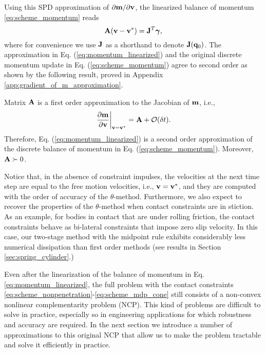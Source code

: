 Using this SPD approximation of $\partial {\mathbf{m}}/\partial {\mathbf{v}}$, the
linearized balance of momentum \eqref{eq:scheme_momentum} reads
\begin{equation}
	\mf{A}(\mf{v}-\mf{v}^*) = \mf{J}^T\mf{\bgamma},
	\label{eq:momentum_linearized}
\end{equation}
where for convenience we use ${\mathbf{J}}$ as a shorthand to denote
${\mathbf{J}}({\mathbf{q}}_0)$. The approximation in Eq. (\ref{eq:momentum_linearized}) and
the original discrete momentum update in Eq. (\ref{eq:scheme_momentum}) agree to
second order as shown by the following result, proved in Appendix
\ref{app:gradient_of_m_approximation}.
\begin{prop}	
Matrix ${\mathbf{A}}$ is a first order approximation to the Jacobian of ${\mathbf{m}}$,
i.e.,
\begin{align*}
	\left. \frac{\partial {\mathbf{m}}}{\partial {\mathbf{v}}} \right|_{{\mathbf{v}}={\mathbf{v}}^*} = {\mathbf{A}} + \mathcal{O}(\delta t).
\end{align*}
Therefore, Eq. (\ref{eq:momentum_linearized}) is a second order approximation of
the discrete balance of momentum in Eq. (\ref{eq:scheme_momentum}). Moreover,
${\mathbf{A}} \succ 0$.
\label{prop:gradient_of_m_approximation}
\end{prop}

Notice that, in the absence of constraint impulses, the velocities at the next
time step are equal to the free motion velocities, i.e., ${\mathbf{v}}={\mathbf{v}}^*$, and
they are computed with the order of accuracy of the $\theta\text{-method}$.
Furthermore, we also expect to recover the properties of the
$\theta\text{-method}$ when contact constraints are in stiction. As an example,
for bodies in contact that are under rolling friction, the contact constraints
behave as bi-lateral constraints that impose zero slip velocity. In this case,
our two-stage method with the midpoint rule exhibits considerably less numerical
dissipation than first order methods (see results in Section
\ref{sec:spring_cylinder}.)

Even after the linearization of the balance of momentum in Eq.
\eqref{eq:momentum_linearized}, the full problem with the contact constraints
\eqref{eq:scheme_nonpenetration}-\eqref{eq:scheme_mdp_cone} still consists of a
non-convex nonlinear complementarity problem (NCP). This kind of problems are
difficult to solve in practice, especially so in engineering applications for
which robustness and accuracy are required. In the next section we introduce a
number of approximations to this original NCP that allow us to make the problem
tractable and solve it efficiently in practice.
